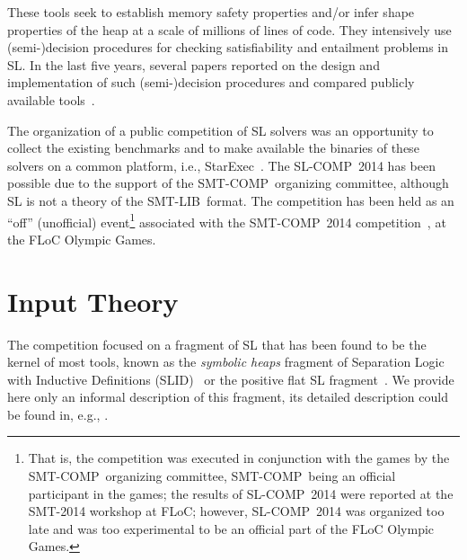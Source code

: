 \documentclass[twoside,11pt]{article}
\newcommand{\SLRD}{\textsc{SLID}}
\newcommand{\smtlib}{\textsf{SMT-LIB}}
\newcommand{\smtcomp}{\textsf{SMT-COMP}}
\newcommand{\slcomp}{\textsf{SL-COMP}}
\newcommand{\starexec}{\textsf{StarExec}}
\begin{document}
These tools seek to establish memory safety properties and/or infer shape properties of the heap at a scale of millions of lines of code.
They intensively use (semi-)decision procedures for checking satisfiability and entailment problems in SL.
In the last five years, several papers reported on the design and implementation of such (semi-)decision procedures and compared publicly available tools~\cite{HasseIOP13}.

The organization of a public competition of SL solvers was an opportunity 
to collect the existing benchmarks and  
to make available the binaries of these solvers on a common platform, i.e., \starexec~\cite{StarExecsite}.
The \slcomp\ 2014 has been possible due to the support of the \smtcomp\ organizing committee, 
although SL is not a theory of the \smtlib\ format.
The competition has been held as an ``off'' (unofficial) event\footnote{That is, the competition was executed in conjunction with the games by the \smtcomp\ organizing committee, \smtcomp\ being an official participant in the games; the results of \slcomp\ 2014 were reported at the SMT-2014 workshop at FLoC; however, \slcomp\ 2014 was organized too late and was too experimental to be an official part of the FLoC Olympic Games.}
associated with the \smtcomp\ 2014 competition~\cite{SMTCOMPsite}, at the FLoC Olympic Games.


\section{Input Theory}
\label{sec:SL}

The competition focused on a fragment of SL that has been found to be the kernel of most tools, known 
as
the \emph{symbolic heaps} fragment
of Separation Logic with Inductive Definitions (\SLRD)~\cite{IosifRS13} or
the positive flat SL fragment~\cite{AntonopoulosGHKO14}. 
We provide here only an informal description of this fragment, its detailed description could be found in, e.g., \cite{Reynolds02,IosifRS13,AntonopoulosGHKO14}.  
\end{document}
